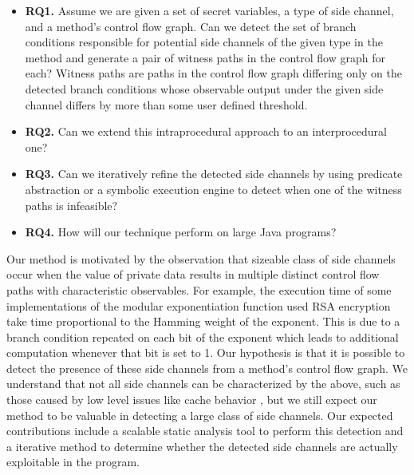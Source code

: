 \begin{itemize}
\item[] \textbf{RQ1.} Assume we are given a set of secret variables, a type of side channel, and a method's control flow graph. Can we detect the set of branch conditions responsible for potential side channels of the given type in the method and generate a pair of witness paths in the control flow graph for each? Witness paths are paths in the control flow graph differing only on the detected branch conditions whose observable output under the given side channel differs by more than some user defined threshold. 
\item[] \textbf{RQ2.} Can we extend this intraprocedural approach to an interprocedural one? 
\item[] \textbf{RQ3.} Can we iteratively refine the detected side channels by using predicate abstraction or a symbolic execution engine to detect when one of the witness paths is infeasible?
\item[] \textbf{RQ4.} How will our technique perform on large Java programs?
\end{itemize}

Our method is motivated by the observation that sizeable class of side channels occur when the value of private data results in multiple distinct control flow paths with characteristic observables. For example, the execution time of some implementations of the modular exponentiation function used RSA encryption take time proportional to the Hamming weight of the exponent. This is due to a branch condition repeated on each bit of the exponent which leads to additional computation whenever that bit is set to 1. Our hypothesis is that it is possible to detect the presence of these side channels from a method's control flow graph. We understand that not all side channels can be characterized by the above, such as those caused by low level issues like cache behavior \cite{cache}, but we still expect our method to be valuable in detecting a large class of side channels. Our expected contributions include a scalable static analysis tool to perform this detection and a iterative method to determine whether the detected side channels are actually exploitable in the program.